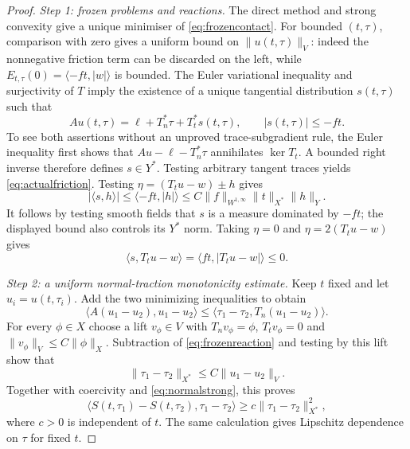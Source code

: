 \documentclass[11pt,a4paper]{article}
\theoremstyle{definition}\newtheorem{definition}[theorem]{Definition}
\theoremstyle{remark}\newtheorem{remark}[theorem]{Remark}
\newcommand{\ip}[2]{\langle #1,#2\rangle}
\numberwithin{equation}{section}
\begin{document}
\begin{proof}
\emph{Step 1: frozen problems and reactions.}
The direct method and strong convexity give a unique minimiser of \eqref{eq:frozencontact}. For bounded $(t,\tau)$, comparison with zero gives a uniform bound on $\|u(t,\tau)\|_V$: indeed the nonnegative friction term can be discarded on the left, while $E_{t,\tau}(0)=\ip{-ft}{|w|}$ is bounded. The Euler variational inequality and surjectivity of $T$ imply the existence of a unique tangential distribution $s(t,\tau)$ such that
\begin{equation}\label{eq:frozenreaction}
 Au(t,\tau)=\ell+T_n^*\tau+T_t^*s(t,\tau),\qquad
 |s(t,\tau)|\le-ft.
\end{equation}
To see both assertions without an unproved trace-subgradient rule, the Euler inequality first shows that $Au-\ell-T_n^*\tau$ annihilates $\ker T_t$. A bounded right inverse therefore defines $s\in Y^*$. Testing arbitrary tangent traces yields \eqref{eq:actualfriction}. Testing $\eta=(T_tu-w)\pm h$ gives
\[
 |\ip{s}{h}|\le\ip{-ft}{|h|}\le C\|f\|_{W^{1,\infty}}\|t\|_{X^*}\|h\|_Y.
\]
It follows by testing smooth fields that $s$ is a measure dominated by $-ft$; the displayed bound also controls its $Y^*$ norm. Taking $\eta=0$ and $\eta=2(T_tu-w)$ gives
\begin{equation}\label{eq:frictionwork}
 \ip{s}{T_tu-w}=\ip{ft}{|T_tu-w|}\le0.
\end{equation}

\emph{Step 2: a uniform normal-traction monotonicity estimate.}
Keep $t$ fixed and let $u_i=u(t,\tau_i)$. Add the two minimizing inequalities to obtain
\begin{equation}\label{eq:normalstrong}
 \ip{A(u_1-u_2)}{u_1-u_2}
 \le\ip{\tau_1-\tau_2}{T_n(u_1-u_2)}.
\end{equation}
For every $\phi\in X$ choose a lift $v_\phi\in V$ with $T_nv_\phi=\phi$, $T_tv_\phi=0$ and $\|v_\phi\|_V\le C\|\phi\|_X$. Subtraction of \eqref{eq:frozenreaction} and testing by this lift show that
\[
 \|\tau_1-\tau_2\|_{X^*}\le C\|u_1-u_2\|_V.
\]
Together with coercivity and \eqref{eq:normalstrong}, this proves
\begin{equation}\label{eq:Snormalstrong}
 \ip{S(t,\tau_1)-S(t,\tau_2)}{\tau_1-\tau_2}
 \ge c\|\tau_1-\tau_2\|_{X^*}^2,
\end{equation}
where $c>0$ is independent of $t$. The same calculation gives Lipschitz dependence on $\tau$ for fixed $t$.


\end{proof}
\end{document}
